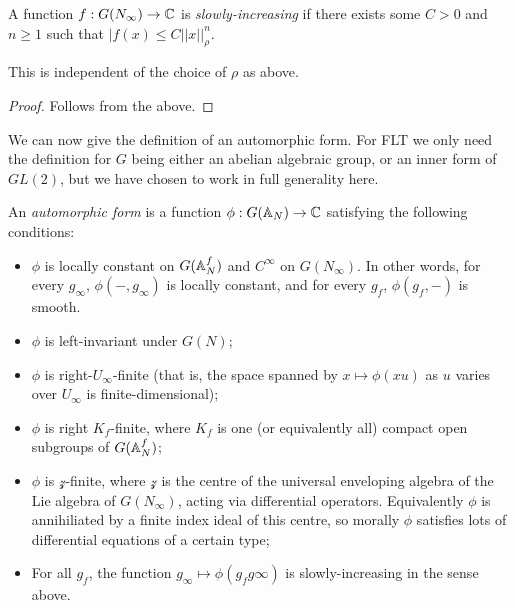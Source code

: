 \begin{definition}\label{slowly_increasing}\notready A function $f : G(N_\infty)\to\mathbb{C}$ is \emph{slowly-increasing} if there exists some $C>0$
    and $n\geq1$ such that $|f(x)\leq C||x||_\rho^n$.
\end{definition}

\begin{theorem}\label{slowly_increasing_well_defined}\notready This is independent of the choice of $\rho$ as above.
\end{theorem}
\begin{proof} Follows from the above.
\end{proof}

We can now give the definition of an automorphic form. For FLT we only need the definition for $G$ being either an abelian algebraic group, or an inner form of $GL(2)$, but we have chosen to work in full generality here. 

\begin{definition}\label{automorphic_form}\notready An \emph{automorphic form} is a function $\phi:G(\mathbb{A}_N)\to\mathbb{C}$ satisfying the following conditions:
    \begin{itemize}
        \item $\phi$ is locally constant on $G(\mathbb{A}_N^f)$ and $C^\infty$ on $G(N_\infty)$. In other words, for every $g_\infty$, $\phi(-,g_\infty)$ is locally constant, and for every $g_f$, $\phi(g_f,-)$ is smooth.
        \item $\phi$ is left-invariant under $G(N)$;
        \item $\phi$ is right-$U_\infty$-finite (that is, the space spanned by $x\mapsto \phi(xu)$ as $u$ varies over $U_\infty$ is finite-dimensional);
        \item $\phi$ is right $K_f$-finite, where $K_f$ is one (or equivalently all) compact open subgroups of $G(\mathbb{A}_N^f)$;
        \item $\phi$ is $\mathcal{z}$-finite, where $\mathcal{z}$ is the centre of the universal enveloping algebra of the Lie algebra of $G(N_\infty)$, acting via differential operators. Equivalently $\phi$ is annihiliated by a finite index ideal of this centre, so morally $\phi$ satisfies lots of differential equations of a certain type;
        \item For all $g_f$, the function $g_\infty\mapsto \phi(g_f g\infty)$ is slowly-increasing in the sense above.
    \end{itemize}
\end{definition}

